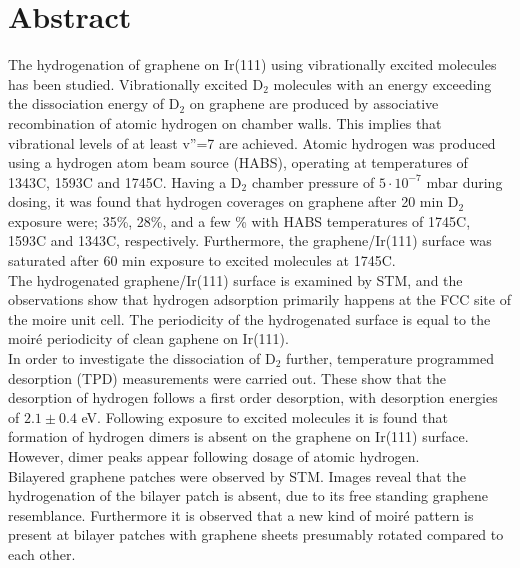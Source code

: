 \vspace{6cm}
\chapter*{Abstract}

The hydrogenation of graphene on Ir(111) using vibrationally excited molecules has been studied. Vibrationally excited D$_2$ molecules with an energy exceeding the dissociation energy of D$_2$ on graphene are produced by associative recombination of atomic hydrogen on chamber walls. This implies that vibrational levels of at least v''=7 are achieved. Atomic hydrogen was produced using a hydrogen atom beam source (HABS), operating at temperatures of 1343\degree C, 1593\degree C and 1745\degree C. Having a D$_2$ chamber pressure of $5 \cdot 10^{-7}$ mbar during dosing, it was found that hydrogen coverages on graphene after 20 min D$_2$ exposure were; 35\%, 28\%, and a few \% with HABS temperatures of 1745\degree C, 1593\degree C and 1343\degree C, respectively. Furthermore, the graphene/Ir(111) surface was saturated after 60 min exposure to excited molecules at 1745\degree C.\\
The hydrogenated graphene/Ir(111) surface is examined by STM, and the observations show that hydrogen adsorption primarily happens at the FCC site of the moire unit cell. The periodicity of the hydrogenated surface is equal to the moiré periodicity of clean gaphene on Ir(111).\\
In order to investigate the dissociation of D$_2$ further, temperature programmed desorption (TPD) measurements were carried out. These show that the desorption of hydrogen follows a first order desorption, with desorption energies of $ 2.1 \pm 0.4$ eV. Following exposure to excited molecules it is found that formation of hydrogen dimers is absent on the graphene on Ir(111) surface. However, dimer peaks appear following dosage of atomic hydrogen.\\
Bilayered graphene patches were observed by STM. Images reveal that the hydrogenation of the bilayer patch is absent, due to its free standing graphene resemblance. Furthermore it is observed that a new kind of moiré pattern is present at bilayer patches with graphene sheets presumably rotated compared to each other.
